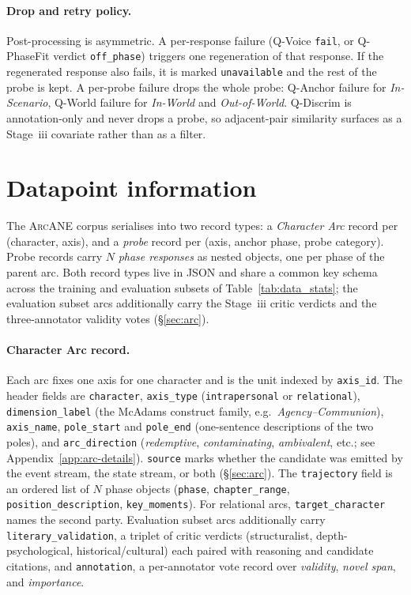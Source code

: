 \documentclass{llmxive}
\providecommand{\ours}{\textsc{ArcANE}}
\begin{document}
\paragraph{Drop and retry policy.}
Post-processing is asymmetric. A per-response failure (Q-Voice \texttt{fail}, or Q-PhaseFit verdict \texttt{off\_phase}) triggers one regeneration of that response. If the regenerated response also fails, it is marked \texttt{unavailable} and the rest of the probe is kept. A per-probe failure drops the whole probe: Q-Anchor failure for \emph{In-Scenario}, Q-World failure for \emph{In-World} and \emph{Out-of-World}. Q-Discrim is annotation-only and never drops a probe, so adjacent-pair similarity surfaces as a Stage~iii covariate rather than as a filter.

\section{Datapoint information\label{app:datapoint}}

The \ours{} corpus serialises into two record types: a \emph{Character Arc} record per (character, axis), and a \emph{probe} record per (axis, anchor phase, probe category). Probe records carry $N$ \emph{phase responses} as nested objects, one per phase of the parent arc. Both record types live in JSON and share a common key schema across the training and evaluation subsets of Table~\ref{tab:data_stats}; the evaluation subset arcs additionally carry the Stage~iii critic verdicts and the three-annotator validity votes (\S\ref{sec:arc}).

\paragraph{Character Arc record.}
Each arc fixes one axis for one character and is the unit indexed by \texttt{axis\_id}. The header fields are \texttt{character}, \texttt{axis\_type} (\texttt{intrapersonal} or \texttt{relational}), \texttt{dimension\_label} (the McAdams construct family, e.g.\ \emph{Agency--Communion}), \texttt{axis\_name}, \texttt{pole\_start} and \texttt{pole\_end} (one-sentence descriptions of the two poles), and \texttt{arc\_direction} (\emph{redemptive}, \emph{contaminating}, \emph{ambivalent}, etc.; see Appendix~\ref{app:arc-details}). \texttt{source} marks whether the candidate was emitted by the event stream, the state stream, or both (\S\ref{sec:arc}). The \texttt{trajectory} field is an ordered list of $N$ phase objects (\texttt{phase}, \texttt{chapter\_range}, \texttt{position\_description}, \texttt{key\_moments}). For relational arcs, \texttt{target\_character} names the second party. Evaluation subset arcs additionally carry \texttt{literary\_validation}, a triplet of critic verdicts (structuralist, depth-psychological, historical/cultural) each paired with reasoning and candidate citations, and \texttt{annotation}, a per-annotator vote record over \emph{validity}, \emph{novel span}, and \emph{importance}.
\end{document}
